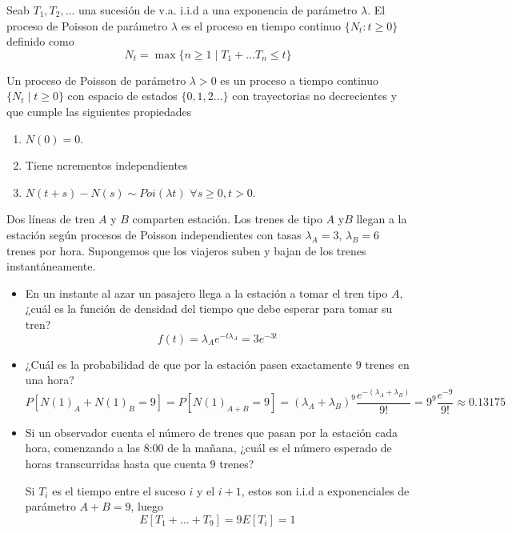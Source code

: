 \documentclass[PREyA.tex]{subfiles}
\begin{document}
\begin{defi}
Seab $T_1,T_2,\dotsc$ una sucesión de v.a. i.i.d  a una exponencia de parámetro $\lambda$. El proceso de Poisson de parámetro $\lambda$ es el proceso en tiempo continuo $\{N_t:t\geq 0\}$ definido como 
$$
N_t = \max\{n\geq 1\mid T_1+\dotsc T_n \leq t\}
$$
\end{defi}
\begin{defi}
Un proceso de Poisson de parámetro $\lambda > 0$ es un proceso a tiempo continuo $\{N_t \mid t\geq0\}$ con espacio de estados $\{0,1,2\dotsc\}$ con trayectorias no decrecientes y que cumple las siguientes propiedades
\begin{enumerate}
\item $N(0)=0$.
\item Tiene ncrementos independientes
\item $N(t+s)-N(s) \sim Poi(\lambda t)$ $\forall s\geq 0, t>0$.
\end{enumerate}
\end{defi}
\begin{example}
Dos líneas de tren $A$ y $B$ comparten estación. Los trenes de tipo $A$ y$B$ llegan a la estación según procesos de Poisson independientes con tasas $\lambda_A =3$, $\lambda_B =6$ trenes por hora. Supongemos que los viajeros suben y bajan de los trenes instantáneamente.
\begin{itemize}
\item En un instante al azar un pasajero llega a la estación a tomar el tren tipo $A$, ¿cuál es la función de densidad del tiempo que debe esperar para tomar su tren?
$$
f(t) = \lambda_A e^{-t\lambda_A} = 3e^{-3t}
$$
\item ¿Cuál es la probabilidad de que por la estación pasen exactamente $9$ trenes en una hora?
$$
P[N(1)_A + N(1)_B = 9] = P[N(1)_{A+B} = 9] = (\lambda_A + \lambda_B)^9\frac{e^{-(\lambda_A+\lambda_B)}}{9!} = 9^9\frac{e^{-9}}{9!} \approx 0.13175
$$
\item Si un observador cuenta el número de trenes que pasan por la estación cada hora, comenzando a las 8:00 de la mañana, ¿cuál es el número esperado de horas transcurridas hasta que cuenta $9$ trenes?

Si $T_i$ es el tiempo entre el suceso $i$ y el $i+1$, estos son i.i.d a exponenciales de parámetro $A+B=9$, luego
$$
E[T_1 + \dotsc + T_9] = 9 E[T_i] = 1
$$
\end{itemize}
\end{example}
\newpage
\end{document}
